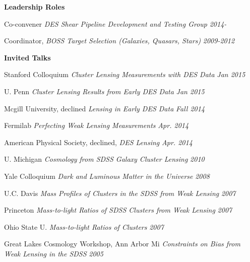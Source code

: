 \ssp
\ssp
\noindent
\parbox[l]{1.25in}{{\bf Leadership Roles}}
\parbox[t]{5.40in}{

Co-convener {\it DES Shear Pipeline Development and Testing Group} \hfill {\small \it 2014-} \newline

Coordinator, {\it BOSS Target Selection (Galaxies, Quasars, Stars) } \hfill {\small \it 2009-2012} \newline

}
\ssp
\ssp
\noindent
\parbox[l]{1.25in}{{\bf Invited Talks}}
\parbox[t]{5.40in}{

Stanford Colloquium {\it Cluster Lensing Measurements with DES Data} \hfill {\small \it Jan 2015} \newline

U. Penn  {\it Cluster Lensing Results from Early DES Data} \hfill {\small \it Jan 2015} \newline

Mcgill University, declined {\it Lensing in Early DES Data} \hfill {\small \it Fall 2014} \newline

Fermilab {\it Perfecting Weak Lensing Measurements} \hfill {\small \it Apr. 2014} \newline

American Physical Society, declined, {\it DES Lensing} \hfill {\small \it Apr. 2014} \newline

U. Michigan {\it  Cosmology from SDSS Galaxy Cluster Lensing} \hfill {\small \it 2010} \newline

Yale Colloquium {\it Dark and Luminous Matter in the Universe}     \hfill {\small \it 2008} \newline

U.C. Davis {\it Mass Profiles of Clusters in the SDSS from Weak Lensing} \hfill {\small \it 2007} \newline

Princeton {\it Mass-to-light Ratios of SDSS Clusters from Weak Lensing} \hfill {\small \it 2007} \newline

Ohio State U. {\it Mass-to-light Ratios of Clusters} \hfill {\small \it 2007} \newline

Great Lakes Cosmology Workshop, Ann Arbor Mi {\it Constraints on Bias from Weak Lensing in the SDSS} \hfill {\small \it 2005} \newline

}
